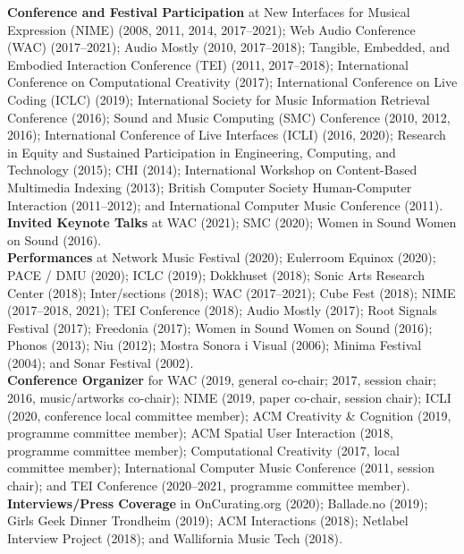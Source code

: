 \documentclass[10pt, a4paper]{article}
\begin{document}
{\textbf{Conference and Festival Participation}} at New Interfaces for Musical Expression (NIME) (2008, 2011, 2014, 2017--2021); Web Audio Conference (WAC) (2017--2021); Audio Mostly (2010, 2017--2018); Tangible, Embedded, and Embodied Interaction Conference (TEI) (2011, 2017--2018); International Conference on Computational Creativity (2017); International Conference on Live Coding (ICLC) (2019); International Society for Music Information Retrieval Conference (2016); Sound and Music Computing (SMC) Conference (2010, 2012, 2016); International Conference of Live Interfaces (ICLI) (2016, 2020); Research in Equity and Sustained Participation in Engineering, Computing, and Technology (2015); CHI (2014); International Workshop on Content-Based Multimedia Indexing (2013); British Computer Society Human-Computer Interaction (2011--2012); and International Computer Music Conference (2011).\\

{\textbf{Invited Keynote Talks}} at WAC (2021); SMC (2020); Women in Sound Women on Sound (2016).\\

{\textbf{Performances}} at Network Music Festival (2020); Eulerroom Equinox (2020); PACE / DMU (2020); ICLC (2019); Dokkhuset (2018); Sonic Arts Research Center (2018); Inter/sections (2018); WAC (2017--2021); Cube Fest (2018); NIME (2017--2018, 2021); TEI Conference (2018); Audio Mostly (2017); Root Signals Festival (2017); Freedonia (2017); Women in Sound Women on Sound (2016); Phonos (2013); Niu (2012); Mostra Sonora i Visual (2006); Minima Festival (2004); and Sonar Festival (2002).\\

{\textbf{Conference Organizer}} for WAC (2019, general co-chair; 2017, session chair; 2016, music/artworks co-chair); NIME (2019, paper co-chair, session chair); ICLI (2020, conference local committee member); ACM Creativity \& Cognition (2019, programme committee member); ACM Spatial User Interaction (2018, programme committee member); Computational Creativity (2017, local committee member); International Computer Music Conference (2011, session chair); and TEI Conference (2020--2021, programme committee member).\\

{\textbf{Interviews/Press Coverage}} in OnCurating.org (2020); Ballade.no (2019); Girls Geek Dinner Trondheim (2019); ACM Interactions (2018); Netlabel Interview Project (2018); and Wallifornia Music Tech (2018).\\
\end{document}
